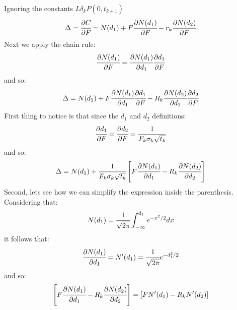 \documentclass[12pt,a4paper]{book}
\begin{document}
\begin{solution}
Ignoring the constants $L\delta_k P(0,t_{k+1})$
\begin{equation*}
\Delta =\cfrac{\partial C}{\partial F} = N(d_1) + F\cfrac{\partial N(d_1)}{\partial F} - r_k\cfrac{\partial N(d_2)}{\partial F}
\end{equation*}
Next we apply the chain rule:
\begin{equation*}
	\cfrac{\partial N(d_1)}{\partial F} = \cfrac{\partial N(d_1)}{\partial d_1}\cfrac{\partial d_1}{\partial F}
\end{equation*}
and so:
\begin{equation*}
\Delta = N(d_1) + F\cfrac{\partial N(d_1)}{\partial d_1}\cfrac{\partial d_1}{\partial F} - R_k \cfrac{\partial N(d_2)}{\partial d_2}\cfrac{\partial d_2}{\partial F}
\end{equation*}
First thing to notice is that since the $d_1$ and $d_2$ definitions:
\begin{equation*}
\cfrac{\partial d_1}{\partial F} = \cfrac{\partial d_2}{\partial F}=\cfrac{1}{F_k\sigma_k\sqrt{t_k}}
\end{equation*}
and so:
\begin{equation*}
\Delta = N(d_1) + \cfrac{1}{F_k\sigma_k\sqrt{t_k}}\left[F\cfrac{\partial N(d_1)}{\partial d_1} - R_k \cfrac{\partial N(d_2)}{\partial d_2}\right]
\end{equation*}
Second, lets see how we can simplify the expression inside the parenthesis. Considering that:
\begin{equation*}
N(d_1) = \cfrac{1}{\sqrt{2\pi}}\int_{-\infty}^{d_1} e^{-x^2/2}dx
\end{equation*}	
it follows that:
\begin{equation*}
\cfrac{\partial N(d_1)}{\partial d_1}=N'(d_1)=\cfrac{1}{\sqrt{2\pi}}e^{-d_1^2/2}
\end{equation*}
and so:
\begin{equation*}
\left[F\cfrac{\partial N(d_1)}{\partial d_1} - R_k \cfrac{\partial N(d_2)}{\partial d_2}\right] = \left[FN'(d_1)-R_kN'(d_2)\right]
\end{equation*}


\end{solution}
\end{document}
